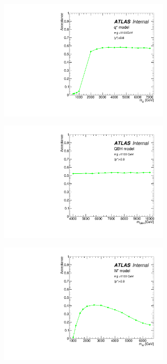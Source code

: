 \begin{figure}[htbp]
  \begin{subfigure}{.5\textwidth}
  \centering
   \includegraphics[width=0.9\textwidth]{figuresDijet/03-BenchmarkSignals/Acc_Qstar.pdf}
   \caption{}
   \label{fig:QStar1}
  \end{subfigure}
  \begin{subfigure}{.5\textwidth}
  \centering
   \includegraphics[width=0.9\textwidth]{figuresDijet/03-BenchmarkSignals/Acc_QBH.pdf}
   \caption{}
   \label{fig:QBH1}
  \end{subfigure}
\newline
  \begin{subfigure}{.5\textwidth}
  \centering
   \includegraphics[width=0.9\textwidth]{figuresDijet/03-BenchmarkSignals/Acc_Wprime.pdf}

\end{subfigure}
\end{figure}
